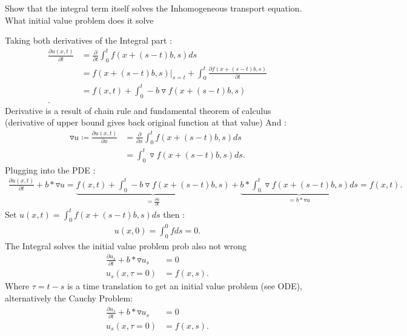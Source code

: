 \begin{question}[subtitle=Inhomogeneous Transport Equation (c)]
	Show that the integral term itself solves the Inhomogeneous transport equation. What
	initial value problem does it solve
\end{question}
\begin{solution}
	Taking both derivatives of the Integral part :
	\begin{align*}
		\frac{\partial u(x,t)}{\partial t} & = \frac{\partial }{\partial t}  \int_0^t f(x+(s-t)b,s)ds                          \\
		                                   & = f(x+(s-t)b,s) \vert_{s=t}  + \int_0^t \frac{\partial f(x+(s-t)b,s)}{\partial t} \\
		                                   & = f(x,t) + \int_0^t -b \triangledown f(x+(s-t)b,s)                                \\
		.\end{align*}
	Derivative is a result of chain rule and fundamental theorem of calculus (derivative of upper bound gives back original function at that value)
	And :
	\begin{align*}
		\triangledown u \coloneqq \frac{\partial u(x,t)}{\partial x} & = \frac{\partial }{\partial x}  \int_0^t f(x+(s-t)b,s)ds \\
		                                                             & = \int_0^t \triangledown f(x+(s-t)b,s) ds
		.\end{align*}
	Plugging into the PDE :
	\begin{align*}
		\frac{\partial u(x,t)}{\partial t} + b* \triangledown u =  \underbrace{f(x,t) + \int_0^t -b \triangledown f(x+(s-t)b,s)}_{= \frac{\partial u}{\partial t} }  + \underbrace{b*\int_0^t \triangledown f(x+(s-t)b,s) ds}_{=b*\triangledown u} = f(x,t)
		.\end{align*}
  Set $u(x,t) = \int_0^t f(x+(s-t)b,s) ds$ then : 
  \begin{align*}
    u(x,0) =  \int_0^0 f ds =  0
  .\end{align*}
  The Integral solves the initial value problem prob also not wrong \\[1ex]
	\begin{align*}
		\frac{\partial u_s}{\partial t} + b*\triangledown u_s & = 0      \\
		u_s(x,\tau=0)                                         & = f(x,s)
		.\end{align*}
	Where $\tau = t-s$ is a time translation to get an initial value problem (see ODE), alternatively the Cauchy Problem:
	\begin{align*}
		\frac{\partial u_s}{\partial t} + b*\triangledown u_s & = 0      \\
		u_s(x,\tau=0)                                         & = f(x,s)
		.\end{align*}

\end{solution}
